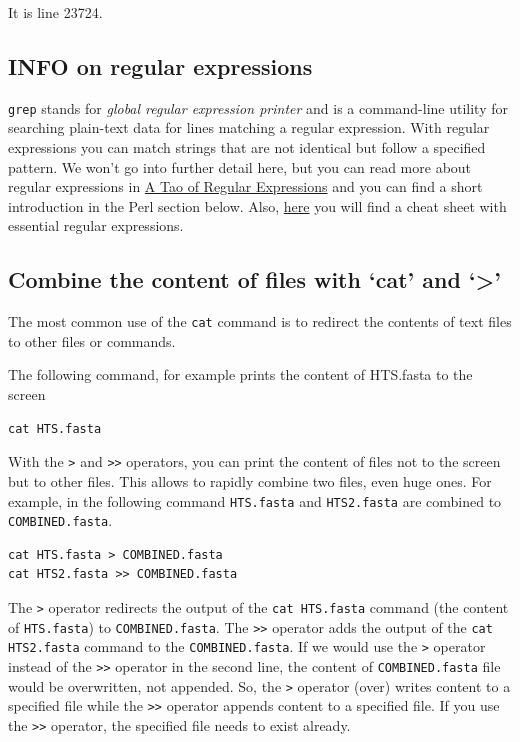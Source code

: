 \documentclass[11pt]{article}
\begin{document}
It is line 23724.
\subsection{INFO on regular expressions}
\label{sec-4-3}


\texttt{grep} stands for \emph{global regular expression printer} and is a
command-line utility for searching plain-text data for lines matching
a regular expression. With regular expressions you can match strings
that are not identical but follow a specified pattern.  We won't
go into further detail here, but you can read more about regular
expressions in \href{http://www.scootersoftware.com/RegEx.html}{A Tao of Regular Expressions} and you can find a 
short introduction in the Perl section below. Also, \href{http://www.cheatography.com/davechild/cheat-sheets/regular-expressions/}{here} you will find
a cheat sheet with essential regular expressions.
\subsection{Combine the content of files with `cat' and `>'}
\label{sec-4-4}

The most common use of the \texttt{cat} command is to redirect the contents of
text files to other files or commands.

The following command, for example prints the content of HTS.fasta to the screen


\begin{verbatim}
cat HTS.fasta
\end{verbatim}

With the \texttt{>} and \texttt{>>} operators, you can print the content of files
not to the screen but to other files. This allows to rapidly combine
two files, even huge ones. For example, in the following command
\texttt{HTS.fasta} and \texttt{HTS2.fasta} are combined to
\texttt{COMBINED.fasta}.


\begin{verbatim}
cat HTS.fasta > COMBINED.fasta
cat HTS2.fasta >> COMBINED.fasta
\end{verbatim}

The \texttt{>} operator redirects the output of the \texttt{cat HTS.fasta}
command (the content of \texttt{HTS.fasta}) to \texttt{COMBINED.fasta}. The
\texttt{>>} operator adds the output of the \texttt{cat HTS2.fasta} command to
the \texttt{COMBINED.fasta}. If we would use the \texttt{>} operator instead of
the \texttt{>>} operator in the second line, the content of
\texttt{COMBINED.fasta} file would be overwritten, not appended. So, the \texttt{>}
operator (over) writes content to a specified file while the \texttt{>>}
operator appends content to a specified file. If you use the \texttt{>>}
operator, the specified file needs to exist already.
\end{document}
